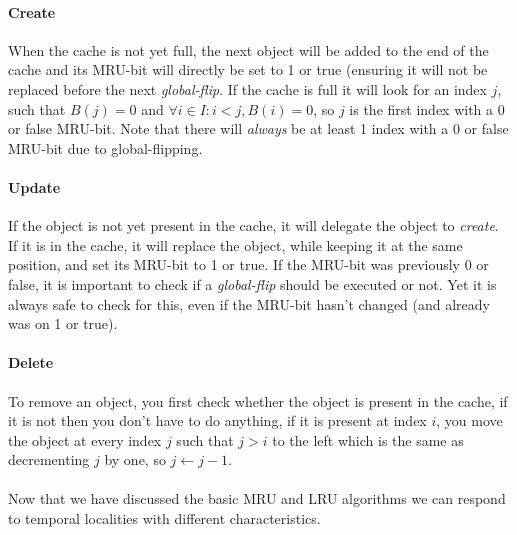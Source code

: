 \documentclass[pdftex,a4paper,12pt,twoside]{report}
\begin{document}
\paragraph{Create} When the cache is not yet full, the next object will be added to the end of the cache and its MRU-bit will directly be set to 1 or true (ensuring it will not 
be replaced before the next \emph{global-flip}. If the cache is full it will look for an index $j$, such that $B(j) = 0$ and $\forall i \in I : i < j, B(i) = 0$, so $j$ is the first index with a 0 or false MRU-bit. Note that there will \emph{always} be at least 1 index with a 0 or false MRU-bit due to global-flipping.
\paragraph{Update} If the object is not yet present in the cache, it will delegate the object to \emph{create}. If it is in the cache, it will replace the object, while keeping it at the same position, and set its MRU-bit to 1 or true. If the MRU-bit was previously 0 or false, it is important to check if a \emph{global-flip} should be executed or not. Yet it is always safe to check for this, even if the MRU-bit hasn't changed (and already was on 1 or true).
\paragraph{Delete} To remove an object, you first check whether the object is present in the cache, if it is not then you don't have to do anything, if it is present at index $i$, you move the object at every index $j$ such that $j > i$ to the left which is the same as decrementing $j$ by one, so $j \leftarrow j - 1$.
\\\\
\citep{guan2014wcet} Now that we have discussed the basic MRU and LRU algorithms we can respond to temporal localities with different characteristics.
\end{document}
